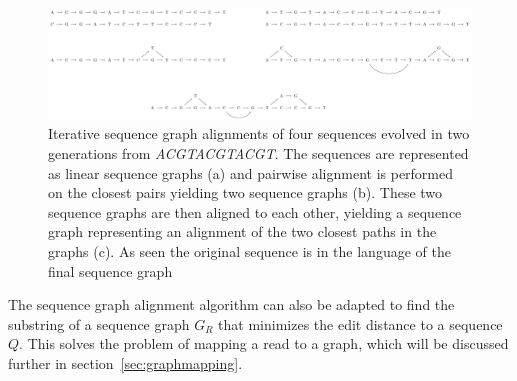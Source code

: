 \begin{figure}
  \includegraphics[width=\textwidth,height=\textheight,keepaspectratio]{figures/graph_msa}
  \caption{
    Iterative sequence graph alignments of four sequences evolved in two generations from \emph{ACGTACGTACGT}.
    The sequences are represented as linear sequence graphs (a) and pairwise alignment is performed on the closest pairs yielding two sequence graphs (b).
    These two sequence graphs are then aligned to each other, yielding a sequence graph representing an alignment of the two closest paths in the graphs (c).
    As seen the original sequence is in the language of the final sequence graph}
  \label{fig:treealign}
\end{figure}

The sequence graph alignment algorithm can also be adapted to find the substring of a sequence graph $G_R$ that minimizes the edit distance to a sequence $Q$.
This solves the problem of mapping a read to a graph, which will be discussed further in section~\ref{sec:graphmapping}.


